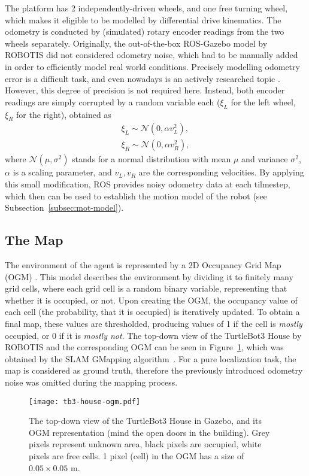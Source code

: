The platform has 2 independently-driven wheels, and one free turning wheel, which
makes it eligible to be modelled by differential drive kinematics.
The odometry is conducted by (simulated) rotary encoder readings from the two wheels separately.
Originally, the out-of-the-box ROS-Gazebo model by ROBOTIS did not considered odometry noise,
which had to be manually added in order to efficiently model real world conditions.
Precisely modelling odometry error is a difficult task, and even nowadays is an actively researched topic \cite{Fazekas2021}.
However, this degree of precision is not required here.
Instead, both encoder readings are simply corrupted by a random variable each  ($\xi_L$ for the left wheel, $\xi_R$ for the right), obtained as
\begin{align}
    \xi_L \sim \mathcal{N}(0,\alpha v_L^{2}), \\
    \xi_R \sim \mathcal{N}(0,\alpha v_R^{2}),
\end{align}
where $\mathcal{N}(\mu,\sigma^{2})$ stands for a normal distribution with mean $\mu$ and variance $\sigma^{2}$,
$\alpha$ is a scaling parameter, and $v_L, v_R$ are the corresponding velocities. By applying this small modification,
ROS provides noisy odometry data at each tilmestep, which then can be used to establish the motion model of the robot (see Subsection~\ref{subsec:mot-model}).

\subsection{The Map}
The environment of the agent is represented by a 2D Occupancy Grid Map (OGM) \cite{Moravec1985}.
This model describes the environment by dividing it to finitely many grid cells, where each grid cell is a random binary variable,
representing that whether it is occupied, or not.
Upon creating the OGM, the occupancy value of each cell (the probability, that it is occupied) is iteratively updated.
To obtain a final map, these values are thresholded, producing values of 1 if the cell is \emph{mostly} occupied,
or 0 if it is \emph{mostly not}.
The top-down view of the TurtleBot3 House by ROBOTIS and the corresponding OGM can be seen in Figure~\ref{fig:tb3-house-ogm},
which was obtained by the SLAM GMapping algorithm~\cite{Grisetti2007}.
For a pure localization task, the map is considered as ground truth,
therefore the previously introduced odometry noise was omitted during the mapping process.
\begin{figure}[htbp]
    \centering
    \texttt{[image: tb3-house-ogm.pdf]}
    \caption{The top-down view of the TurtleBot3 House in Gazebo, and its OGM representation (mind the open doors in the building).
        Grey pixels represent unknown area, black pixels are occupied, white pixels are free cells.
        1 pixel (cell) in the OGM has a size of $0.05 \times 0.05$ m. }
    \label{fig:tb3-house-ogm}
\end{figure}
